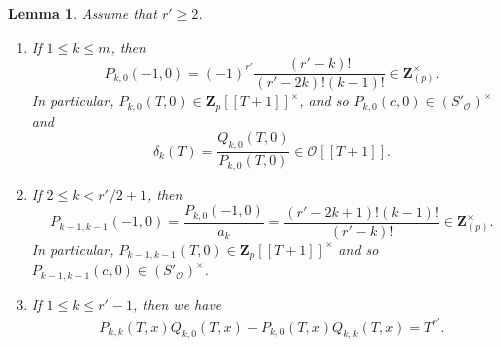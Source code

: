 \documentclass[11pt]{amsart}
\theoremstyle{definition}
\numberwithin{equation}{subsection}
\theoremstyle{plain}
\theoremstyle{plain}
\theoremstyle{plain}
\theoremstyle{plain}
\theoremstyle{plain}
\theoremstyle{plain}
\theoremstyle{plain}
\theoremstyle{plain}
\theoremstyle{plain}
\newtheorem{lemm}[equation]{Lemma}
\theoremstyle{plain}
\theoremstyle{plain}
\theoremstyle{plain}
\theoremstyle{definition}
\theoremstyle{definition}
\theoremstyle{definition}
\theoremstyle{remark}
\renewcommand{\(}{\textup{(}}
\renewcommand{\)}{\textup{)}}
\newcommand{\Z}{\mathbf{Z}}
\newcommand{\cO}{\mathcal{O}}
\begin{document}
\begin{lemm}\label{lemma-delta-denom-1}
Assume that $r'\geq 2$.
\begin{enumerate}[leftmargin=*]
  \item If $1\leq k\leq m$, then
    \begin{equation*}
        P_{k,0}(-1,0)=(-1)^{r'}\frac{(r'-k)!}{(r'-2k)!(k-1)!}\in\Z_{(p)}^\times.
    \end{equation*}
    In particular, $P_{k,0}(T,0)\in \Z_p[[T+1]]^\times$, and so
    $P_{k,0}(c,0)\in(S'_\cO)^\times$ and $$\delta_k(T)=\frac{Q_{k,0}(T,0)}{P_{k,0}(T,0)}\in\cO[[T+1]].$$
  \item If $2\leq k<r'/2+1$, then
    \begin{equation*}
        P_{k-1,k-1}(-1,0) =\frac{P_{k,0}(-1,0)}{a_k} =\frac{(r'-2k+1)!(k-1)!}{(r'-k)!} \in\Z_{(p)}^{\times}.
    \end{equation*}
    In particular, $P_{k-1,k-1}(T,0)\in \Z_p[[T+1]]^\times$ and so $P_{k-1,k-1}(c,0)\in(S'_\cO)^\times$.
  \item If $1\leq k\leq r'-1$, then we have
  \begin{align*}
    P_{k,k}(T,x)Q_{k,0}(T,x)-P_{k,0}(T,x)Q_{k,k}(T,x)=T^{r'}.
  \end{align*}
\end{enumerate}
\end{lemm}
\end{document}
